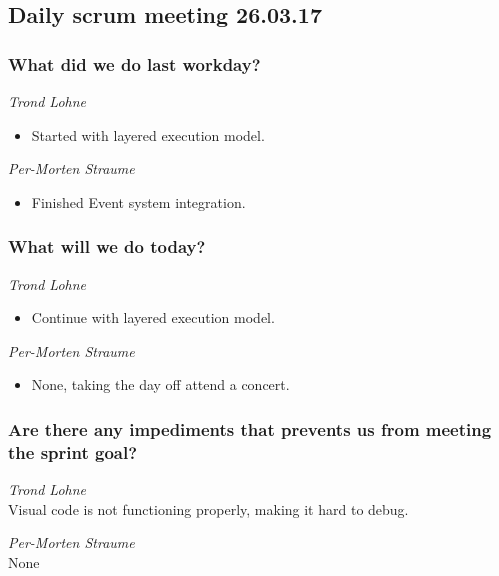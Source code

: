 \documentclass{article}
\begin{document}
\begin{center}
\subsection*{Daily scrum meeting 26.03.17}
\end{center}
\bigskip


\subsubsection*{What did we do last workday?}

\noindent\textit{Trond Lohne}
\begin{itemize}
	\item 
	Started with layered execution model.
\end{itemize}

\medskip

\noindent\textit{Per-Morten Straume}
\begin{itemize}
	\item 
	Finished Event system integration.
\end{itemize}


\subsubsection*{What will we do today?}

\noindent\textit{Trond Lohne}
\begin{itemize}
	\item 
	Continue with layered execution model.
\end{itemize}

\medskip

\noindent\textit{Per-Morten Straume}
\begin{itemize}
	\item 
	None, taking the day off attend a concert.
\end{itemize}


\subsubsection*{Are there any impediments that prevents us from meeting the sprint goal?}

\noindent\textit{Trond Lohne}\\
Visual code is not functioning properly, making it hard to debug.

\medskip

\noindent\textit{Per-Morten Straume}\\
None
\end{document}

